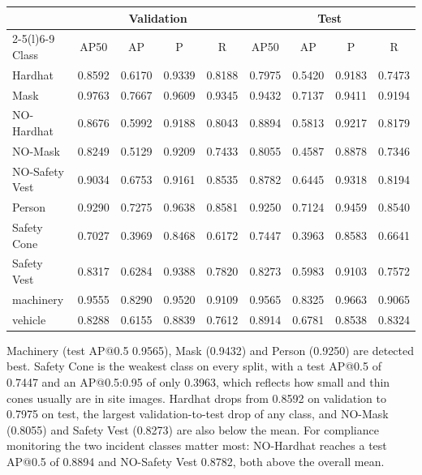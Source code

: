 \documentclass[preprint,12pt]{elsarticle}
\begin{document}
\begin{center}
\begin{minipage}{\linewidth}
\centering
\small
\captionsetup{hypcap=false}
\label{tab:perclass}
\setlength{\tabcolsep}{4pt}
\begin{tabular}{@{}lcccccccc@{}}
\toprule
& \multicolumn{4}{c}{Validation} & \multicolumn{4}{c}{Test} \\
\cmidrule(lr){2-5}\cmidrule(l){6-9}
Class & AP50 & AP & P & R & AP50 & AP & P & R \\
\midrule
Hardhat & 0.8592 & 0.6170 & 0.9339 & 0.8188 & 0.7975 & 0.5420 & 0.9183 & 0.7473 \\
Mask & 0.9763 & 0.7667 & 0.9609 & 0.9345 & 0.9432 & 0.7137 & 0.9411 & 0.9194 \\
NO-Hardhat & 0.8676 & 0.5992 & 0.9188 & 0.8043 & 0.8894 & 0.5813 & 0.9217 & 0.8179 \\
NO-Mask & 0.8249 & 0.5129 & 0.9209 & 0.7433 & 0.8055 & 0.4587 & 0.8878 & 0.7346 \\
NO-Safety Vest & 0.9034 & 0.6753 & 0.9161 & 0.8535 & 0.8782 & 0.6445 & 0.9318 & 0.8194 \\
Person & 0.9290 & 0.7275 & 0.9638 & 0.8581 & 0.9250 & 0.7124 & 0.9459 & 0.8540 \\
Safety Cone & 0.7027 & 0.3969 & 0.8468 & 0.6172 & 0.7447 & 0.3963 & 0.8583 & 0.6641 \\
Safety Vest & 0.8317 & 0.6284 & 0.9388 & 0.7820 & 0.8273 & 0.5983 & 0.9103 & 0.7572 \\
machinery & 0.9555 & 0.8290 & 0.9520 & 0.9109 & 0.9565 & 0.8325 & 0.9663 & 0.9065 \\
vehicle & 0.8288 & 0.6155 & 0.8839 & 0.7612 & 0.8914 & 0.6781 & 0.8538 & 0.8324 \\
\bottomrule
\end{tabular}
\end{minipage}
\end{center}

Machinery (test AP@0.5 0.9565), Mask (0.9432) and Person (0.9250) are detected best. Safety Cone is the weakest class on every split, with a test AP@0.5 of 0.7447 and an AP@0.5:0.95 of only 0.3963, which reflects how small and thin cones usually are in site images. Hardhat drops from 0.8592 on validation to 0.7975 on test, the largest validation-to-test drop of any class, and NO-Mask (0.8055) and Safety Vest (0.8273) are also below the mean. For compliance monitoring the two incident classes matter most: NO-Hardhat reaches a test AP@0.5 of 0.8894 and NO-Safety Vest 0.8782, both above the overall mean.
\end{document}
